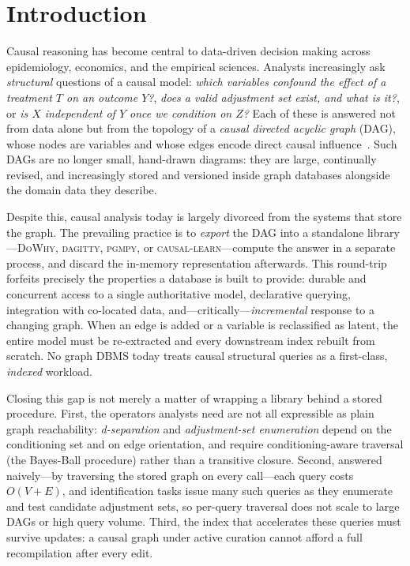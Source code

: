 \section{Introduction}\label{sec:intro}

Causal reasoning has become central to data-driven decision making across
epidemiology, economics, and the empirical sciences. Analysts increasingly ask
\emph{structural} questions of a causal model: \emph{which variables confound
the effect of a treatment $T$ on an outcome $Y$?}, \emph{does a valid adjustment
set exist, and what is it?}, or \emph{is $X$ independent of $Y$ once we condition
on $Z$?} Each of these is answered not from data alone but from the topology of a
\emph{causal directed acyclic graph} (DAG), whose nodes are variables and whose
edges encode direct causal influence~\cite{pearl2009causality}. Such DAGs are no
longer small, hand-drawn diagrams: they are large, continually revised, and
increasingly stored and versioned inside graph databases alongside the domain
data they describe.

Despite this, causal analysis today is largely divorced from the systems that
store the graph. The prevailing practice is to \emph{export} the DAG into a
standalone library---\textsc{DoWhy}, \textsc{dagitty}, \textsc{pgmpy}, or
\textsc{causal-learn}---compute the answer in a separate process, and discard the
in-memory representation afterwards. This round-trip forfeits precisely the
properties a database is built to provide: durable and concurrent access to a
single authoritative model, declarative querying, integration with co-located
data, and---critically---\emph{incremental} response to a changing graph. When an
edge is added or a variable is reclassified as latent, the entire model must be
re-extracted and every downstream index rebuilt from scratch. No graph DBMS
today treats causal structural queries as a first-class, \emph{indexed} workload.

Closing this gap is not merely a matter of wrapping a library behind a stored
procedure. First, the operators analysts need are not all expressible as plain
graph reachability: \emph{d-separation} and \emph{adjustment-set enumeration}
depend on the conditioning set and on edge orientation, and require
conditioning-aware traversal (the Bayes-Ball procedure) rather than a transitive
closure. Second, answered naively---by traversing the stored graph on every
call---each query costs $O(V{+}E)$, and identification tasks issue many such
queries as they enumerate and test candidate adjustment sets, so per-query
traversal does not scale to large DAGs or high query volume. Third, the index
that accelerates these queries must survive updates: a causal graph under active
curation cannot afford a full recompilation after every edit.

